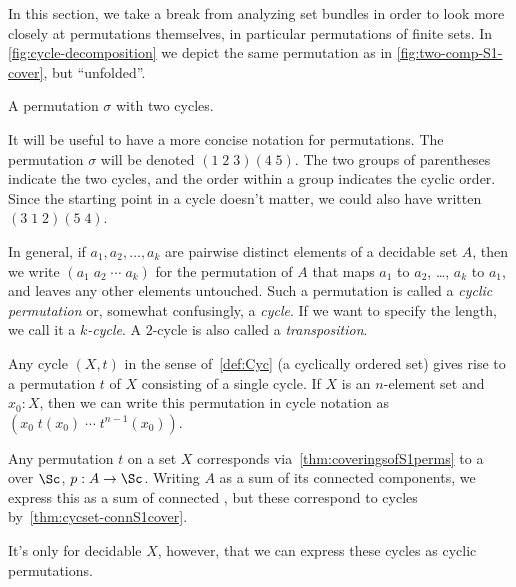 In this section, we take a break from analyzing set bundles in order to look more closely at permutations themselves, in particular permutations of finite sets.
In \cref{fig:cycle-decomposition} we depict the same permutation as in \cref{fig:two-comp-S1-cover}, but ``unfolded''.
\begin{marginfigure}
  \caption{A permutation $\sigma$ with two cycles.}
  \label{fig:cycle-decomposition}
\end{marginfigure}
It will be useful to have a more concise notation for permutations.
The permutation $\sigma$ will be denoted $(1\;2\;3)(4\;5)$.
The two groups of parentheses indicate the two cycles,
and the order within a group indicates the cyclic order.
Since the starting point in a cycle doesn't matter,
we could also have written $(3\;1\;2)(5\;4)$.

In general, if $a_1,a_2,\dots,a_k$ are pairwise distinct elements of a decidable set $A$,
then we write $(a_1\;a_2\;\cdots\;a_k)$ for the permutation of $A$
that maps $a_1$ to $a_2$, \ldots, $a_k$ to $a_1$, and leaves any other elements untouched.
Such a permutation is called a \emph{cyclic permutation} or, somewhat confusingly, a \emph{cycle}.
If we want to specify the length, we call it a \emph{$k$-cycle}.
A $2$-cycle is also called a \emph{transposition}.

\begin{remark}\label{rem:cycle-vs-cycle}
  Any cycle $(X,t)$ in the sense of~\cref{def:Cyc} (\ie a cyclically ordered set)
  gives rise to a permutation $t$ of $X$ consisting of a single cycle.
  If $X$ is an $n$-element set and $x_0:X$,
  then we can write this permutation in cycle notation
  as $(x_0\;t(x_0)\;\cdots\;t^{n-1}(x_0))$.

  Any permutation $t$ on a set $X$ corresponds via~\cref{thm:coveringsofS1perms}
  to a \covering over $\Sc$, $p : A \to \Sc$.
  Writing $A$ as a sum of its connected components,
  we express this \covering as a sum of connected \coverings,
  but these correspond to cycles by~\cref{thm:cycset-connS1cover}.

  It's only for decidable $X$, however, that we can express these
  cycles as cyclic permutations.
\end{remark}

